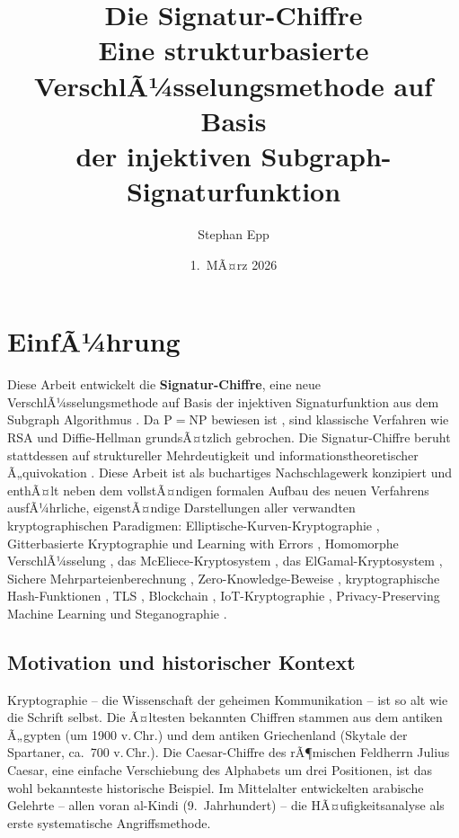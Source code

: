 ﻿\documentclass[a4paper,12pt]{scrreprt}
\title{\textbf{Die Signatur-Chiffre}\\[0.8ex]
\large Eine strukturbasierte VerschlÃ¼sselungsmethode auf Basis\\
der injektiven Subgraph-Signaturfunktion}
\author{Stephan Epp}
\date{1.\ MÃ¤rz 2026}
\theoremstyle{definition}
\begin{document}
\maketitle

\tableofcontents
\newpage

\section{EinfÃ¼hrung}

Diese Arbeit entwickelt die \textbf{Signatur-Chiffre}, eine neue VerschlÃ¼sselungsmethode auf Basis der injektiven Signaturfunktion aus dem Subgraph Algorithmus \cite{Epp26a}. Da $\mathrm{P}=\mathrm{NP}$ bewiesen ist \cite{Epp26a}, sind klassische Verfahren wie RSA \cite{Riv78} und Diffie-Hellman \cite{DH76} grundsÃ¤tzlich gebrochen. Die Signatur-Chiffre beruht stattdessen auf struktureller Mehrdeutigkeit und informationstheoretischer Ã„quivokation \cite{Sha49}. Diese Arbeit ist als buchartiges Nachschlagewerk konzipiert und enthÃ¤lt neben dem vollstÃ¤ndigen formalen Aufbau des neuen Verfahrens ausfÃ¼hrliche, eigenstÃ¤ndige Darstellungen aller verwandten kryptographischen Paradigmen: Elliptische-Kurven-Kryptographie \cite{Kob87,Mil86}, Gitterbasierte Kryptographie und Learning with Errors \cite{Reg05,LPR10}, Homomorphe VerschlÃ¼sselung \cite{Gen09,BGV12,CKKS17}, das McEliece-Kryptosystem \cite{McE78}, das ElGamal-Kryptosystem \cite{ElG85}, Sichere Mehrparteienberechnung \cite{Yao82,GMW87}, Zero-Knowledge-Beweise \cite{GMR89,BFM88}, kryptographische Hash-Funktionen \cite{Dam89,Mer89}, TLS \cite{Res18}, Blockchain \cite{Nak08}, IoT-Kryptographie \cite{BSW07}, Privacy-Preserving Machine Learning \cite{GLP+21} und Steganographie \cite{Cox97}.

\subsection{Motivation und historischer Kontext}

Kryptographie -- die Wissenschaft der geheimen Kommunikation -- ist so alt wie die Schrift selbst. Die Ã¤ltesten bekannten Chiffren stammen aus dem antiken Ã„gypten (um 1900 v.\,Chr.) und dem antiken Griechenland (Skytale der Spartaner, ca.\ 700 v.\,Chr.). Die Caesar-Chiffre des rÃ¶mischen Feldherrn Julius Caesar, eine einfache Verschiebung des Alphabets um drei Positionen, ist das wohl bekannteste historische Beispiel. Im Mittelalter entwickelten arabische Gelehrte -- allen voran al-Kindi (9.\ Jahrhundert) -- die HÃ¤ufigkeitsanalyse als erste systematische Angriffsmethode.
\end{document}

